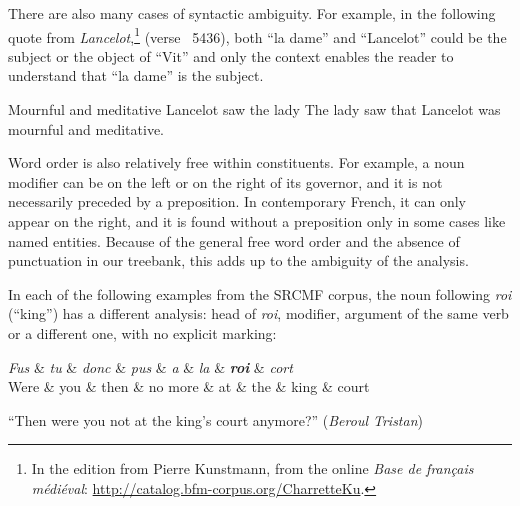 There are also many cases of syntactic ambiguity. For example, in the following quote from \emph{Lancelot},\footnote{In the edition from Pierre Kunstmann, from the online \textit{Base de français médiéval}: \url{http://catalog.bfm-corpus.org/CharretteKu}.} (verse ~5436),
both \enquote{la dame} and \enquote{Lancelot} could be the subject or the object of \enquote{Vit} and only the context enables the reader to understand that \enquote{la dame} is the subject.

{Mournful and meditative Lancelot saw the lady}
{The lady saw that Lancelot was mournful and meditative.}

Word order is also relatively free within constituents. For example, a noun modifier can be on the left or on the right of its governor, and it is not necessarily preceded by a preposition. In contemporary French, it can only appear on the right, and it is found without a preposition only in some cases like named entities. Because of the general free word order and the absence of punctuation in our treebank, this adds up to the ambiguity of the analysis.

In each of the following examples from the SRCMF corpus, the noun following \emph{roi} (\enquote{king}) has a different analysis: head of \emph{roi}, modifier, argument of the same verb or a different one, with no explicit marking:

\begin{center}
    \begin{dependency}[theme=simple]
        \begin{deptext}[row 2/.style={font=\small}]
            \textit{Fus} \& \textit{tu} \& \textit{donc} \& \textit{pus} \& \textit{a} \& \textit{la} \& \textbf{\textit{roi}} \& \textit{cort} \\
            Were \& you \& then \& no more \& at \& the \& king \& court \\
        \end{deptext}
    \end{dependency}

    \raggedright
    \enquote{Then were you not at the king's court anymore?} (\emph{Beroul Tristan})
\end{center}

